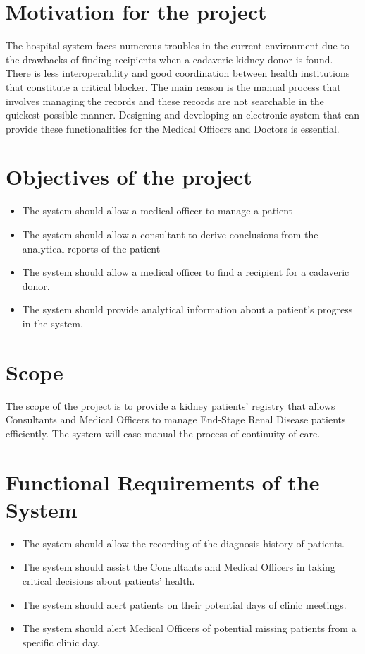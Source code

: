 \documentclass[12pt,a4paper]{report}
\begin{document}
\section{Motivation for the project}
The hospital system faces numerous troubles in the current environment due to the drawbacks of finding recipients when a cadaveric kidney donor is found.  There is less interoperability and good coordination between health institutions that constitute a critical blocker. The main reason is the manual process that involves managing the records and these records are not searchable in the quickest possible manner. Designing and developing an electronic system that can provide these functionalities for the Medical Officers and Doctors is essential.  


\section{Objectives of the project}

\begin{itemize}
\item The system should allow a medical officer to manage a patient 
\item The system should allow a consultant to derive conclusions from the analytical reports of the patient
\item The system should allow a medical officer to find a recipient for a cadaveric donor. 
\item The system should provide analytical information about a patient’s progress in the system. 
	
\end{itemize}


\section{Scope}
The scope of the project is to provide a kidney patients’ registry that allows Consultants and Medical Officers to manage End-Stage Renal Disease patients efficiently. The system will ease manual the process of continuity of care. 

\section{Functional Requirements of the System}

\begin{itemize}
\item The system should allow the recording of the diagnosis history of patients. 
\item The system should assist the Consultants and Medical Officers in taking critical decisions about patients’ health. 
\item The system should alert patients on their potential days of clinic meetings.
\item The system should alert Medical Officers of potential missing patients from a specific clinic day.

\end{itemize}
\end{document}
